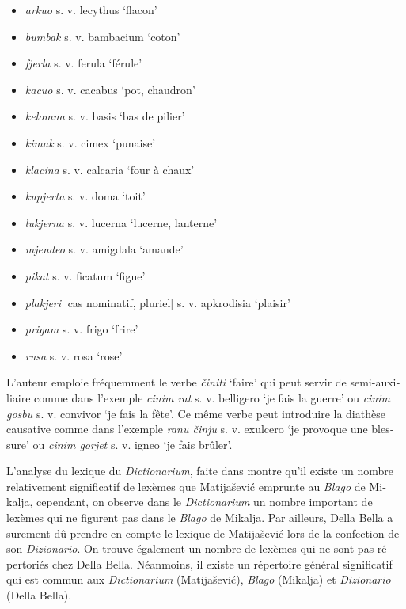 \documentclass[output=paper,colorlinks,citecolor=brown,arabicfont,chinesefont,booklanguage=french]{langscibook}
\begin{document}
\begin{otherlanguage}{french}
\begin{itemize}
    \item \emph{arkuo} s. v. lecythus ‘flacon’
    \item \emph{bumbak} s. v. bambacium ‘coton’
    \item \emph{fjerla} s. v. ferula ‘férule’
    \item \emph{kacuo} s. v. cacabus ‘pot, chaudron’
    \item \emph{kelomna} s. v. basis ‘bas de pilier’
    \item \emph{kimak} s. v. cimex ‘punaise’
    \item \emph{klacina} s. v. calcaria ‘four à chaux’
    \item \emph{kupjerta} s. v. doma ‘toit’
    \item \emph{lukjerna} s. v. lucerna ‘lucerne, lanterne’
    \item \emph{mjendeo} s. v. amigdala ‘amande’
    \item \emph{pikat} s. v. ficatum ‘figue’ 
    \item \emph{plakjeri} [cas nominatif, pluriel] s. v. apkrodisia ‘plaisir’
    \item \emph{prigam} s. v. frigo ‘frire’
    \item \emph{rusa} s. v. rosa ‘rose’ 
\end{itemize}

L’auteur emploie fréquemment le verbe \emph{činiti} ‘faire’ qui peut servir de semi-auxiliaire comme dans l’exemple \emph{cinim rat} s. v. belligero ‘je fais la guerre’ ou \emph{cinim gosbu} s. v. convivor ‘je fais la fête’. Ce même verbe peut introduire la diathèse causative comme dans l’exemple \emph{ranu činju} s. v. exulcero ‘je provoque une blessure’ ou \emph{cinim gorjet} s. v. igneo ‘je fais brûler’.

L’analyse du lexique du \emph{Dictionarium}, faite dans \citet{Franic2014} montre qu’il existe un nombre relativement significatif de lexèmes que Matijašević emprunte au \emph{Blago} de Mikalja, cependant, on observe dans le \emph{Dictionarium} un nombre important de lexèmes qui ne figurent pas dans le \emph{Blago} de Mikalja. Par ailleurs, Della Bella a surement dû prendre en compte le lexique de Matijašević lors de la confection de son \emph{Dizionario}. On trouve également un nombre de lexèmes qui ne sont pas répertoriés chez Della Bella. Néanmoins, il existe un répertoire général significatif qui est commun aux \emph{Dictionarium} (Matijašević), \emph{Blago} (Mikalja) et \emph{Dizionario} (Della Bella).   


\end{otherlanguage}
\end{document}
